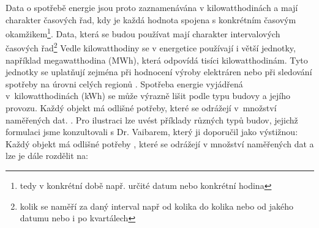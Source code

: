 Data o spotřebě energie jsou proto zaznamenávána v kilowatthodinách a mají charakter časových řad, kdy je každá hodnota spojena s konkrétním časovým okamžikem\footnote{tedy v konkrétní době např. určité datum nebo konkrétní hodina}.
Data, která se budou používat mají charakter intervalových časových řad\footnote{kolik se naměří za daný interval  např od kolika do kolika nebo od jakého datumu nebo i po kvartálech}
 Vedle kilowatthodiny se v energetice používají i větší jednotky, například megawatthodina (MWh), která odpovídá tisíci kilowatthodinám. Tyto jednotky se uplatňují zejména při hodnocení výroby elektráren nebo při sledování spotřeby na úrovni celých regionů \cite{CSU2023}.
Spotřeba energie vyjádřená v~kilowatthodinách (kWh) se může výrazně lišit podle typu budovy a jejího provozu. Každý objekt má odlišné potřeby, které se odrážejí v~množství naměřených dat. . Pro ilustraci lze uvést příklady různých typů budov, jejichž formulaci jsme konzultovali s Dr. Vaibarem, který ji doporučil jako výstižnou: Každý objekt má odlišné potřeby , které se odrážejí v množství naměřených dat a lze je dále rozdělit na:

